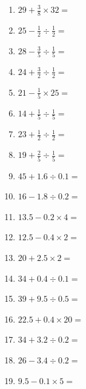 \documentclass[12pt]{article}
\begin{document}
\begin{enumerate}
\item \large $ 29 + \frac{3}{8} \times 32 = $ \vspace{1.6cm}
\item \large $ 25 - \frac{1}{2} \div \frac{1}{2} = $ \vspace{1.6cm}
\item \large $ 28 - \frac{3}{5} \div \frac{1}{5} = $ \vspace{1.6cm}
\newpage
\item \large $ 24 + \frac{3}{2} \div \frac{1}{2} = $ \vspace{1.6cm}
\item \large $ 21 - \frac{1}{5} \times 25 = $ \vspace{1.6cm}
\item \large $ 14 + \frac{1}{5} \div \frac{1}{5} = $ \vspace{1.6cm}
\item \large $ 23 + \frac{1}{2} \div \frac{1}{2} = $ \vspace{1.6cm}
\item \large $ 19 + \frac{2}{5} \div \frac{1}{5} = $ \vspace{1.6cm}
\item \large $ 45 + 1.6 \div 0.1 = $ \vspace{1.6cm}
\item \large $ 16 - 1.8 \div 0.2 = $ \vspace{1.6cm}
\item \large $ 13.5 - 0.2 \times 4 = $ \vspace{1.6cm}
\item \large $ 12.5 - 0.4 \times 2 = $ \vspace{1.6cm}
\item \large $ 20 + 2.5 \times 2 = $ \vspace{1.6cm}
\newpage
\item \large $ 34 + 0.4 \div 0.1 = $ \vspace{1.6cm}
\item \large $ 39 + 9.5 \div 0.5 = $ \vspace{1.6cm}
\item \large $ 22.5 + 0.4 \times 20 = $ \vspace{1.6cm}
\item \large $ 34 + 3.2 \div 0.2 = $ \vspace{1.6cm}
\item \large $ 26 - 3.4 \div 0.2 = $ \vspace{1.6cm}
\item \large $ 9.5 - 0.1 \times 5 = $ \vspace{1.6cm}

\end{enumerate}
\end{document}
